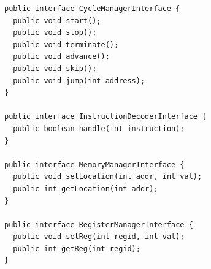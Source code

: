 \documentclass[12pt]{report}
\begin{document}
\begin{verbatim}
public interface CycleManagerInterface {
  public void start();
  public void stop();
  public void terminate();
  public void advance();
  public void skip();
  public void jump(int address);
}

public interface InstructionDecoderInterface {
  public boolean handle(int instruction);
}

public interface MemoryManagerInterface {
  public void setLocation(int addr, int val);
  public int getLocation(int addr);
}

public interface RegisterManagerInterface {
  public void setReg(int regid, int val);
  public int getReg(int regid);
}
\end{verbatim}
\end{document}
